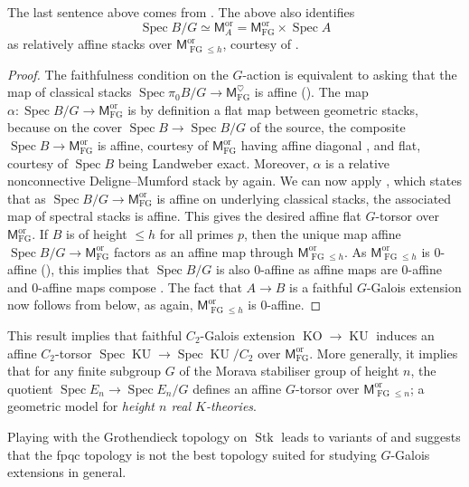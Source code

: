 \documentclass[11pt, a4paper]{article}
\newcommand{\ori}{\mathrm{or}}
\DeclareMathOperator{\Spec}{Spec}
\newcommand{\1}{\mathbf{1}}
\DeclareMathOperator{\KU}{KU}
\DeclareMathOperator{\KO}{KO}
\DeclareMathOperator{\FG}{FG}
\DeclareMathOperator{\Stk}{Stk}
\newcommand{\M}{\mathsf{M}}
\newcommand{\al}{\alpha}
\theoremstyle{plain}
\theoremstyle{definition}
\theoremstyle{remark}\numberwithin{equation}{section}
\begin{document}
The last sentence above comes from \cite[]{akhilandlennart}. The above also identifies 
\[\Spec B / G \simeq \M_A^\ori = \M_{\FG}^\ori \times \Spec A\]
as relatively affine stacks over $\M_{\FG\leq h}^\ori$, courtesy of \cite[Th.D]{reconstruction}.

\begin{proof}
    The faithfulness condition on the $G$-action is equivalent to asking that the map of classical stacks $\Spec \pi_0 B / G \to \M_{\FG}^\heartsuit$ is affine (\cite[]{akhilandlennart}). The map $\al \colon \Spec B / G \to \M_{\FG}^\ori$ is by definition a flat map between geometric stacks, because on the cover $\Spec B \to \Spec B/G$ of the source, the composite $\Spec B \to \M_{\FG}^\ori$ is affine, courtesy of $\M_{\FG}^\ori$ having affine diagonal \cite[Cor.4.1.4.1]{reconstruction}, and flat, courtesy of $\Spec B$ being Landweber exact. Moreover, $\al$ is a relative nonconnective Deligne--Mumford stack by \cite[Cor.4.1.4.1]{reconstruction} again. We can now apply \cite[Cor.3.4.4.6]{reconstruction}, which states that as $\Spec B / G \to \M_{\FG}^\ori$ is affine on underlying classical stacks, the associated map of spectral stacks is affine. This gives the desired affine flat $G$-torsor over $\M_{\FG}^\ori$. If $B$ is of height $\leq h$ for all primes $p$, then the unique map affine $\Spec B / G \to \M_{\FG}^\ori$ factors as an affine map through $\M_{\FG\leq h}^\ori$. As $\M_{\FG\leq h}^\ori$ is 0-affine (\cite[Th.4.4.0.2]{reconstruction}), this implies that $\Spec B / G$ is also 0-affine as affine maps are 0-affine \cite[Pr.2.2.2.5(2)]{reconstruction} and 0-affine maps compose \cite[Pr.2.2.1.6]{reconstruction}. The fact that $A \to B$ is a faithful $G$-Galois extension now follows from  below, as again, $\M_{\FG\leq h}^\ori$ is 0-affine.
\end{proof}

This result implies that faithful $C_2$-Galois extension $\KO \to \KU$ induces an affine $C_2$-torsor $\Spec \KU \to \Spec \KU / C_2$ over $\M_{\FG}^\ori$. More generally, it implies that for any finite subgroup $G$ of the Morava stabiliser group of height $n$, the quotient $\Spec E_n \to \Spec E_n / G$ defines an affine $G$-torsor over $\M_{\FG\leq n}^\ori$; a geometric model for \emph{height $n$ real $K$-theories}.

Playing with the Grothendieck topology on $\Stk$ leads to variants of  and suggests that the fpqc topology is not the best topology suited for studying $G$-Galois extensions in general.
\end{document}
